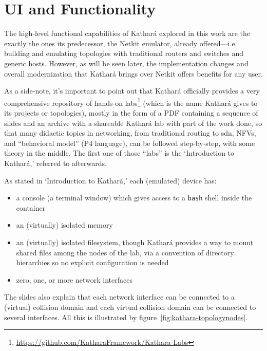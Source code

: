 \section{UI and Functionality}
\label{sec:katharafunctionality}

The high-level functional capabilities of Kathará explored in this work are the exactly the ones its predecessor, the Netkit emulator, already offered---i.e. building and emulating topologies with traditional routers and switches and generic hosts.
However, as will be seen later, the implementation changes and overall modernization that Kathará brings over Netkit offers benefits for any user.

As a side-note, it's important to point out that Kathará officially provides a very comprehensive repository of hands-on labs\footnote{\mbox{\url{https://github.com/KatharaFramework/Kathara-Labs}}} (which is the name Kathará gives to its projects or topologies), mostly in the form of a PDF containing a sequence of slides and an archive with a shareable Kathará lab with part of the work done, so that many didactic topics in networking, from traditional routing to \gls{sdn}, NFVs, and ``behavioral model'' (P4 language), can be followed step-by-step, with some theory in the middle.
The first one of those ``labs'' is the `Introduction to Kathará,' referred to afterwards.



As stated in `Introduction to Kathará,' each (emulated) device has:
\begin{itemize}
  \item a console (a terminal window) which gives access to a \texttt{bash} shell inside the container
  \item an (virtually) isolated memory
  \item an (virtually) isolated filesystem, though Kathará provides a way to mount shared files among the nodes of the lab, via a convention of directory hierarchies so no explicit configuration is needed
  \item zero, one, or more network interfaces
\end{itemize}

The slides also explain that each network interface can be connected to a (virtual) collision domain and each virtual collision domain can be connected to several interfaces.
All this is illustrated by figure~\ref{fig:kathara-topologynodes}.

